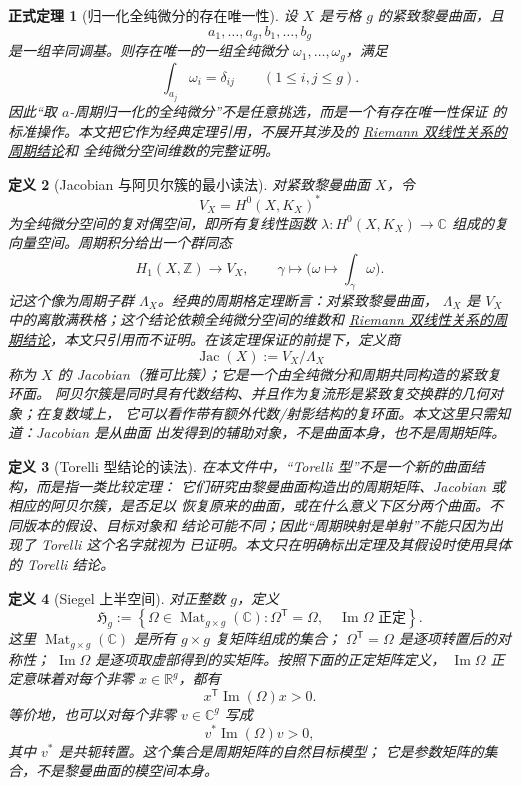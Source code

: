 \documentclass[UTF8,fontset=none,a4paper,11pt]{ctexart}
\theoremstyle{foundation-definition}
\newtheorem{definition}{定义}[section]
\theoremstyle{foundation-theorem}
\newtheorem{theorem}[definition]{正式定理}
\theoremstyle{foundation-proposition}
\theoremstyle{foundation-example}
\theoremstyle{foundation-remark}
\theoremstyle{foundation-theorem}
\newcommand{\term}[2]{\hyperref[#1]{#2}}
\begin{document}
\begin{theorem}[归一化全纯微分的存在唯一性]\label{thm:normalized-differentials}
设 \(X\) 是亏格 \(g\) 的紧致黎曼曲面，且
\[
a_1,\ldots,a_g,b_1,\ldots,b_g
\]
是一组辛同调基。则存在唯一的一组全纯微分
\(\omega_1,\ldots,\omega_g\)，满足
\[
\int_{a_j}\omega_i=\delta_{ij}\qquad(1\leq i,j\leq g).
\]
因此“取 \(a\)-周期归一化的全纯微分”不是任意挑选，而是一个有存在唯一性保证
的标准操作。本文把它作为经典定理引用，不展开其涉及的
\term{thm:riemann-bilinear-period-consequence}{Riemann 双线性关系的周期结论}和
全纯微分空间维数的完整证明。
\end{theorem}

\begin{definition}[Jacobian 与阿贝尔簇的最小读法]\label{def:jacobian}
对紧致黎曼曲面 \(X\)，令
\[
V_X=H^0(X,K_X)^*
\]
为全纯微分空间的复对偶空间，即所有复线性函数
\(\lambda:H^0(X,K_X)\to\mathbb C\) 组成的复向量空间。周期积分给出一个群同态
\[
H_1(X,\mathbb Z)\longrightarrow V_X,\qquad
\gamma\longmapsto\bigl(\omega\longmapsto\int_\gamma\omega\bigr).
\]
记这个像为周期子群 \(\Lambda_X\)。经典的周期格定理断言：对紧致黎曼曲面，
\(\Lambda_X\) 是 \(V_X\) 中的离散满秩格；这个结论依赖全纯微分空间的维数和
\term{thm:riemann-bilinear-period-consequence}{Riemann 双线性关系的周期结论}，本文只引用而不证明。在该定理保证的前提下，定义商
\[
\operatorname{Jac}(X):=V_X/\Lambda_X
\]
称为 \(X\) 的 Jacobian（雅可比簇）；它是一个由全纯微分和周期共同构造的紧致复环面。
阿贝尔簇是同时具有代数结构、并且作为复流形是紧致复交换群的几何对象；在复数域上，
它可以看作带有额外代数/射影结构的复环面。本文这里只需知道：Jacobian 是从曲面
出发得到的辅助对象，不是曲面本身，也不是周期矩阵。
\end{definition}

\begin{definition}[Torelli 型结论的读法]\label{def:torelli-principle}
在本文件中，“Torelli 型”不是一个新的曲面结构，而是指一类比较定理：
它们研究由黎曼曲面构造出的周期矩阵、Jacobian 或相应的阿贝尔簇，是否足以
恢复原来的曲面，或在什么意义下区分两个曲面。不同版本的假设、目标对象和
结论可能不同；因此“周期映射是单射”不能只因为出现了 Torelli 这个名字就视为
已证明。本文只在明确标出定理及其假设时使用具体的 Torelli 结论。
\end{definition}

\begin{definition}[Siegel 上半空间]\label{def:siegel-upper-half-space}
对正整数 \(g\)，定义
\[
\mathfrak H_g
:=\left\{\Omega\in\operatorname{Mat}_{g\times g}(\mathbb C):
\Omega^{\mathsf T}=\Omega,\quad
\operatorname{Im}\Omega\text{ 正定}\right\}.
\]
这里 \(\operatorname{Mat}_{g\times g}(\mathbb C)\) 是所有 \(g\times g\) 复矩阵组成的集合；
\(\Omega^{\mathsf T}=\Omega\) 是逐项转置后的对称性；
\(\operatorname{Im}\Omega\) 是逐项取虚部得到的实矩阵。按照下面的正定矩阵定义，
\(\operatorname{Im}\Omega\) 正定意味着对每个非零 \(x\in\mathbb R^g\)，都有
\[
x^{\mathsf T}\operatorname{Im}(\Omega)x>0.
\]
等价地，也可以对每个非零 \(v\in\mathbb C^g\) 写成
\[
v^*\operatorname{Im}(\Omega)v>0,
\]
其中 \(v^*\) 是共轭转置。这个集合是周期矩阵的自然目标模型；
它是参数矩阵的集合，不是黎曼曲面的模空间本身。
\end{definition}
\end{document}
